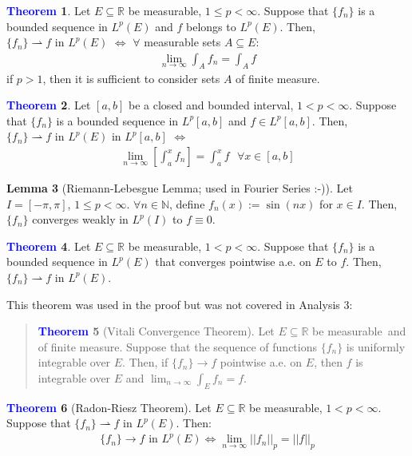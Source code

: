 \documentclass[11pt]{article}
\theoremstyle{definition}
\theoremstyle{definition}
\newcommand{\R}[0]{\mathbb{R}}
\newcommand{\EinR}[0]{Let $E \subseteq \R$ be measurable}
\newcommand{\idx}[2]{\int_{#1}^{#2}}
\newcommand{\warrow}[0]{\rightharpoonup}
\newcommand{\fcvw}[0]{ \{f_n \} \warrow f \text{ in } L^p(E)}
\newtheorem{theorem}{\textcolor{blue}{Theorem}}
\newtheorem{lemma}[theorem]{Lemma}
\theoremstyle{definition}
\theoremstyle{remark}
\begin{document}
\begin{theorem}
	\EinR, $1 \leq p < \infty$. Suppose that $\{f_n \}$ is a bounded sequence in $L^p(E)$ and $f$ belongs to $L^p(E)$. Then, $\fcvw$ $\iff$ $\forall$ measurable sets $A \subseteq E$: 
	\begin{align}
		\lim_{n \rightarrow \infty} \idx{A}{} f_n = \idx{A}{} f
	\end{align}
	if $p > 1$, then it is sufficient to consider sets $A$ of finite measure. 
\end{theorem}

\begin{theorem}
	Let $[a,b]$ be a closed and bounded interval, $1 < p < \infty$. Suppose that $\{ f_n \}$ is a bounded sequence in $L^p[a,b]$ and $f \in L^p[a,b]$. Then, $\fcvw$ in $L^p[a,b]$ $\iff$ 
	\begin{align}
		\lim_{n \rightarrow \infty} \left[		\idx{a}{x} f_n	\right] = \idx{a}{x} f \text{ 			} \forall x \in [a,b] 
	\end{align}
\end{theorem}

\begin{lemma}[Riemann-Lebesgue Lemma; used in Fourier Series :-)] 
	Let $I= [-\pi, \pi]$, $1 \leq p < \infty$. $\forall n \in \mathbb{N}$, define $f_n(x):= \sin(nx)$ for $x \in I$. Then, $\{f_n\}$ converges weakly in $L^p(I)$ to $f \equiv 0$. 
\end{lemma}

\begin{theorem}
	\EinR, $1 < p < \infty$. Suppose that $\{ f_n \}$ is a bounded sequence in $L^p(E)$ that converges pointwise a.e. on $E$ to $f$. Then, $\fcvw$. 
\end{theorem}
This theorem was used in the proof but was not covered in Analysis 3: 
\begin{quote}
	\begin{theorem}[Vitali Convergence Theorem] 
		\EinR\  and of finite measure. Suppose that the sequence of functions $\{ f_n \}$ is uniformly integrable over $E$. Then, if $\{f_n \} \rightarrow f$ pointwise a.e. on $E$, then $f$ is integrable over $E$  and $\lim_{n \rightarrow \infty} \idx{E}{} f_n = f$. 
	\end{theorem}
\end{quote}

\begin{theorem}[Radon-Riesz Theorem]
	\EinR, $1 < p < \infty$. Suppose that $\fcvw$. Then: 
	\begin{align}
		\{f_n \} \rightarrow f \text{ in } L^p(E) \iff \lim_{n \rightarrow \infty} ||f_n||_p = ||f||_p 
	\end{align}
\end{theorem}
\end{document}
